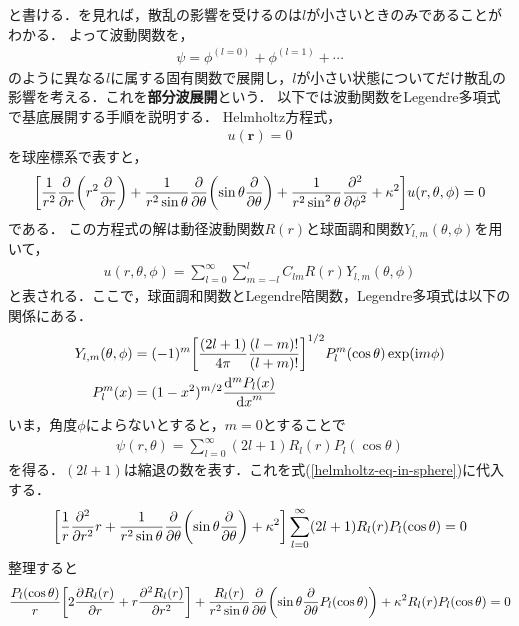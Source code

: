 \documentclass{report}
\begin{document}
    と書ける．を見れば，散乱の影響を受けるのは$l$が小さいときのみであることがわかる．
    よって波動関数を，
    \begin{align}
      \psi = \phi^{(l = 0)} + \phi^{(l = 1)} + \cdots
    \end{align}
    のように異なる$l$に属する固有関数で展開し，$l$が小さい状態についてだけ散乱の影響を考える．これを\textbf{部分波展開}という．
    以下では波動関数をLegendre多項式で基底展開する手順を説明する．
    Helmholtz方程式，
    \begin{align}
      [\laplacian + \kappa^2]u(\bm{r}) = 0
    \end{align}
    を球座標系で表すと，
    \begin{align}
      \qty[\frac{1}{r^2}\pdv{r}\qty(r^2\pdv{r}) + \frac{1}{r^2 \sin \theta} \pdv{\theta}\qty(\sin\theta\pdv{\theta}) + \frac{1}{r^2 \sin^2\theta}\pdv[2]{\phi} + \kappa^2]u(r, \theta, \phi) = 0 \label{helmholtz-eq-in-sphere}
    \end{align}
    である．
  この方程式の解は動径波動関数$R(r)$と球面調和関数$Y_{l, m}(\theta, \phi)$を用いて，
  \begin{align} 
    u(r, \theta, \phi) = \sum_{l = 0}^{\infty}\sum_{m = -l}^{l}C_{lm}R(r)Y_{l, m}(\theta, \phi)
  \end{align}
  と表される．ここで，球面調和関数とLegendre陪関数，Legendre多項式は以下の関係にある．
  \begin{align}
    Y_{l,m}(\theta,\phi) &= (-1)^m \qty[\frac{(2l+1)}{4\pi}\frac{(l-m)!}{(l+m)!}]^{1/2}P_l^m(\cos\theta)\exp(\mathrm{i} m\phi) \\
    P_l^m(x) &= (1-x^2)^{m/2} \frac{\mathrm{d}^m P_l(x)}{\dd{x}^m}
  \end{align}
  いま，角度$\phi$によらないとすると，$m=0$とすることで
  \begin{align}
    \psi(r,\theta) = \sum_{l=0}^{\infty} (2l+1)R_l(r)P_l(\cos\theta)
  \end{align}
  を得る．$(2l+1)$は縮退の数を表す．これを式(\ref{helmholtz-eq-in-sphere})に代入する．
  \begin{align}
    \qty[\frac{1}{r}\frac{\partial^2}{\partial r^2}r + \frac{1}{r^2 \sin \theta} \frac{\partial}{\partial \theta}\qty(\sin\theta\frac{\partial}{\partial \theta})
    + \kappa^2] \sum_{l=0}^{\infty} (2l+1)R_l(r)P_l(\cos\theta)= 0
  \end{align}
  整理すると
  \begin{align}
    \label{Helmholtz separated}
    \frac{P_l(\cos\theta)}{r}\qty[2\frac{\partial R_l(r)}{\partial r} + r \frac{\partial^2 R_l(r)}{\partial r^2}]
    + \frac{R_l(r)}{r^2 \sin \theta} \frac{\partial}{\partial \theta}\qty(\sin\theta\frac{\partial}{\partial\theta}P_l(\cos\theta)) + \kappa^2 R_l(r)P_l(\cos\theta) = 0
  \end{align}
\end{document}
